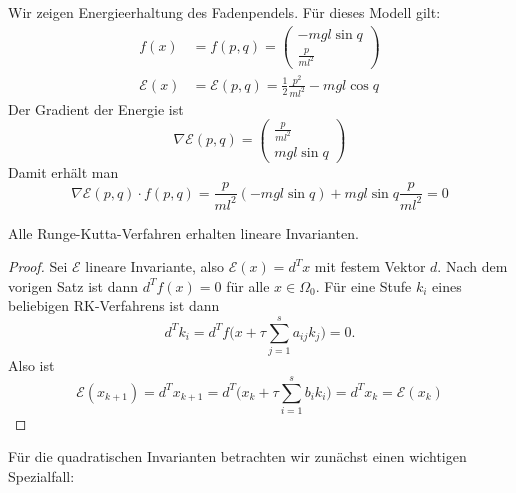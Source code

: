\begin{bsp}
	Wir zeigen Energieerhaltung des Fadenpendels.
	Für dieses Modell gilt:
	\begin{align*}
		f(x) & = f(p,q)
		=
		\begin{pmatrix}
		- mgl \sin q \\ \frac{p}{ml^2}
		\end{pmatrix} \\
		\mathcal{E}(x) & = \mathcal{E}(p,q)
		=
		\frac{1}{2} \frac{p^2}{ml^2} - mgl \cos q
	\end{align*}
	Der Gradient der Energie ist
	\begin{equation*}
		\nabla \mathcal{E}(p,q) =
		\begin{pmatrix}
		\frac{p}{ml^2} \\ mgl \sin q
		\end{pmatrix}
	\end{equation*}
	Damit erhält man
	\begin{equation*}
		\nabla \mathcal{E}(p,q) \cdot f(p,q)
		= \frac{p}{ml^2}(- mgl \sin q) + mgl \sin q\frac{p}{ml^2}
		= 0
	\end{equation*}
\end{bsp}


\begin{satz}
	Alle Runge-Kutta-Verfahren erhalten lineare Invarianten.
\end{satz}
\begin{proof}%
	Sei $\mathcal{E}$ lineare Invariante, also $\mathcal{E}(x) = d^Tx$ mit festem Vektor $d$.
	Nach dem vorigen Satz ist dann $d^T f(x) = 0$ für alle $x\in\Omega_0$.
	Für eine Stufe $k_i$ eines beliebigen RK-Verfahrens ist dann
	\begin{equation*}
		d^T k_i = d^T f\Big( x+\tau\sum_{j=1}^s a_{ij}k_j \Big) = 0.
	\end{equation*}
	Also ist
	\begin{equation*}
		\mathcal E(x_{k+1})
		= d^T x_{k+1}
		= d^T\Big(x_k+\tau\sum_{i=1}^s b_{i}k_i\Big)
		= d^T x_k
		= \mathcal{E}(x_k)
	\end{equation*}
\end{proof}

Für die quadratischen Invarianten betrachten wir zunächst einen wichtigen Spezialfall:

